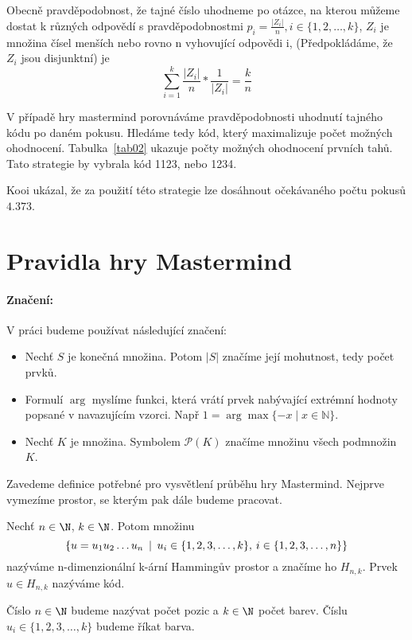 Obecně pravděpodobnost, že tajné číslo uhodneme po otázce, na kterou můžeme dostat k různých odpovědí s pravděpodobnostmi $p_i = \frac{|Z_i|}{n}, i \in \{1, 2, \dots, k\}$, $Z_i$ je množina čísel menších nebo rovno n vyhovující odpovědi i, (Předpokládáme, že $Z_i$ jsou disjunktní) je 
\[\sum_{i = 1}^k \frac{|Z_i|}{n}*\frac{1}{|Z_i|} = \frac{k}{n}\]

V případě hry mastermind porovnáváme pravděpodobnosti uhodnutí tajného kódu po daném pokusu. Hledáme tedy kód, který maximalizuje počet možných ohodnocení. Tabulka~\ref{tab02} ukazuje počty možných ohodnocení prvních tahů. Tato strategie by vybrala kód 1123, nebo 1234. 

Kooi ukázal, že za použití této strategie lze dosáhnout očekávaného počtu pokusů $4.373$.













\chapter{Pravidla hry Mastermind}

\subsubsection{Značení:}
V práci budeme používat následující značení:
\begin{itemize}
    \item Nechť $S$ je konečná množina. Potom $|S|$ značíme její mohutnost, tedy počet prvků.
    \item Formulí $\arg$ myslíme funkci, která vrátí prvek nabývající extrémní hodnoty popsané v navazujícím vzorci. Např $1 = \arg\max \{-x \mid x \in \mathbb{N}\}$.
    \item Nechť $K$ je množina. Symbolem $\mathcal{P}(K)$ značíme množinu všech podmnožin $K$.
\end{itemize}

Zavedeme definice potřebné pro vysvětlení průběhu hry Mastermind. Nejprve vymezíme prostor, se kterým pak dále budeme pracovat. 

\begin{definice}\label{def01:1}
  Nechť $n \in \N $, $k \in \N $. Potom množinu 
  \[ \{ u = u_1u_2 \dots u_n \hspace{2px} \mid \hspace{2px} u_i \in \{1, 2, 3, \dots, k\}, \hspace{2px} i \in \{1, 2, 3, \dots, n\} \}\]
  nazýváme n-dimenzionální k-ární Hammingův prostor a značíme ho $H_{n,k}$. Prvek $u \in H_{n,k}$ nazýváme kód.
\end{definice}
Číslo $n \in \N $ budeme nazývat počet pozic a $k \in \N $ počet barev. Číslu $u_i \in \{1, 2, 3, \dots, k\}$ budeme říkat barva. 


